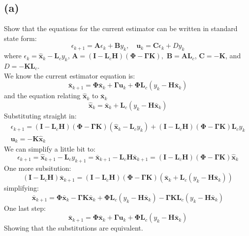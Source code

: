 \documentclass{article}
\begin{document}
\subsection*{(a)}
Show that the equations for the current estimator can be written in standard state form:
\[\epsilon_{k+1}=\pmb{A}\epsilon_k+\pmb{B}y_k,\quad \pmb{u}_k=\pmb{C}\epsilon_k+Dy_k\]
where $\epsilon_k=\hat{\pmb{x}}_k-\pmb{L}_cy_k$, $\pmb{A}=(\pmb{I}-\pmb{L}_c\pmb{H})(\pmb{\Phi}-\pmb{\Gamma}\pmb{K}),$ $\pmb{B}=\pmb{A}\pmb{L}_c$, $\pmb{C}=-\pmb{K}$, and $D=-\pmb{K}\pmb{L}_c$.\\
We know the current estimator equation is:
\[\bar{\pmb{x}}_{k+1}=\pmb{\Phi}\bar{\pmb{x}}_k+\pmb{\Gamma}\pmb{u}_k+\pmb{\Phi}\pmb{L}_c(y_k-\pmb{H}\bar{\pmb{x}}_k)\]
and the equation relating $\hat{\pmb{x}}_k$ to $\bar{\pmb{x}}_k$
\[\hat{\pmb{x}}_k=\bar{\pmb{x}}_k+\pmb{L}_c(y_k-\pmb{H}\bar{\pmb{x}}_k)\]
Substituting straight in:
\[\begin{split}\epsilon_{k+1}=(\pmb{I}-\pmb{L}_c\pmb{H})(\pmb{\Phi}-\pmb{\Gamma}\pmb{K})(\hat{\pmb{x}}_k-\pmb{L}_cy_k)+(\pmb{I}-\pmb{L}_c\pmb{H})(\pmb{\Phi}-\pmb{\Gamma}\pmb{K})\pmb{L}_cy_k\\
\pmb{u}_k=-\pmb{K}\hat{\pmb{x}}_k\end{split}\]
We can simplify a little bit to:
\[\epsilon_{k+1}=\hat{\pmb{x}}_{k+1}-\pmb{L}_cy_{k+1}=\bar{\pmb{x}}_{k+1}-\pmb{L}_c\pmb{H}\bar{\pmb{x}}_{k+1}=(\pmb{I}-\pmb{L}_c\pmb{H})(\pmb{\Phi}-\pmb{\Gamma}\pmb{K})\hat{\pmb{x}}_k\]
One more subsitution:
\[(\pmb{I}-\pmb{L}_c\pmb{H})\bar{\pmb{x}}_{k+1}=(\pmb{I}-\pmb{L}_c\pmb{H})(\pmb{\Phi}-\pmb{\Gamma}\pmb{K})(\bar{\pmb{x}}_k+\pmb{L}_c(y_k-\pmb{H}\bar{\pmb{x}}_k))\]
simplifying:
\[\bar{\pmb{x}}_{k+1}=\pmb{\Phi}\bar{\pmb{x}}_k-\pmb{\Gamma}\pmb{K}\bar{\pmb{x}}_k+\pmb{\Phi}\pmb{L}_c(y_k-\pmb{H}\bar{\pmb{x}}_k)-\pmb{\Gamma}\pmb{K}\pmb{L}_c(y_k-\pmb{H}\bar{\pmb{x}}_k)\]
One last step:
\[\bar{\pmb{x}}_{k+1}=\pmb{\Phi}\bar{\pmb{x}}_{k}+\pmb{\Gamma}\pmb{u}_k+\pmb{\Phi}\pmb{L}_c(y_k-\pmb{H}\bar{\pmb{x}}_k)\]
Showing that the substitutions are equivalent.
\end{document}
